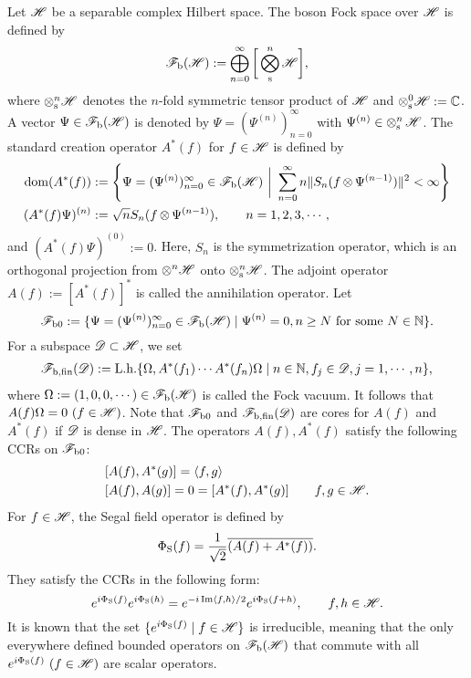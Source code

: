 \documentclass[12pt]{article}
\theoremstyle{plain}
\numberwithin{equation}{section}
\theoremstyle{remark}
\begin{document}
Let $\mathscr{H}$ be a separable complex Hilbert space. The boson Fock space over $\mathscr{H}$ is defined by
\begin{align*}
  \mathscr{F}_\mathrm{b}(\mathscr{H}) := \bigoplus_{n=0}^\infty \bigg[ \mathop{\bigotimes}_\mathrm{s}^n \mathscr{H} \bigg],
\end{align*}
where $\otimes_{\rm s}^n \mathscr{H}$ denotes the $n$-fold symmetric tensor product of $\mathscr{H}$ and $\otimes_{\rm s}^0 \mathscr{H}:=\mathbb{C}$.
A vector $\Psi \in \mathscr{F}_\mathrm{b}(\mathscr{H})$ is denoted by $\Psi = (\Psi^{(n)})_{n=0}^\infty$ with 
$\Psi^{(n)}\in \mathop{\otimes}_\mathrm{s}^n \mathscr{H}$.
The standard creation operator $A^*(f)$ for $f\in\mathscr{H}$ is defined by
\begin{align*}
\mathop{\mathrm{dom}}(A^*(f)) & := \left\{\Psi=(\Psi^{(n)})_{n=0}^\infty \in \mathscr{F}_\mathrm{b}(\mathscr{H}) ~\bigg|~ \sum_{n=0}^\infty n\| S_n(f\mathop{\otimes}\Psi^{(n-1)}) \|^2<\infty\right\} \\
(A^*(f)\Psi)^{(n)} & := \sqrt{n}S_n(f\mathop{\otimes} \Psi^{(n-1)}), \qquad n=1,2,3,\cdots,
\end{align*}
and $(A^*(f)\Psi)^{(0)}:=0$.
Here, $S_n$ is the symmetrization operator, which is an orthogonal projection from $\otimes^n \mathscr{H}$ onto $\otimes_{\rm s}^n \mathscr{H}$.
The adjoint operator $A(f) := [A^*(f)]^*$ is called the annihilation operator.
Let
\[
\mathscr{F}_{\mathrm{b}0} := \{ \Psi=(\Psi^{(n)})_{n=0}^\infty \in \mathscr{F}_\mathrm{b}(\mathscr{H}) \mid \Psi^{(n)} = 0, n\geq N \text{ for some } N\in\mathbb{N} \}.
\]
For a subspace $\mathscr{D} \subset \mathscr{H}$, we set 
\begin{align*}
 \mathscr{F}_\mathrm{b,fin}(\mathscr{D}) := \mathrm{L.h.}\{\Omega, A^*(f_1)\cdots A^*(f_n)\Omega \mid n\in\mathbb{N}, f_j\in\mathscr{D}, j=1,\cdots,n \},
\end{align*}
where $\Omega:=(1,0,0,\cdots)\in\mathscr{F}_\mathrm{b}(\mathscr{H})$ is called the Fock vacuum.
It follows that $A(f)\Omega = 0 ~ (f\in\mathscr{H})$.
Note that $\mathscr{F}_{\mathrm{b}0}$ and $\mathscr{F}_\mathrm{b,fin}(\mathscr{D})$ are cores for $A(f)$ and $A^*(f)$ if $\mathscr{D}$ is dense in $\mathscr{H}$.
The operators $A(f), A^*(f)$ satisfy the following CCRs on $\mathscr{F}_{\mathrm{b}0}$:
\begin{align*}
  & [A(f),A^*(g)] = \left\langle f,g\right\rangle \\
  & [A(f),A(g)] = 0 = [A^*(f), A^*(g)]  ~~~~~~   f,g\in\mathscr{H}.
\end{align*}
For $f\in\mathscr{H}$, the Segal field operator is defined by
\begin{align*}
  \Phi_\mathrm{S}(f) = \frac{1}{\sqrt{2}} \overline{(A(f)+A^*(f))}.
\end{align*}
They satisfy the CCRs in the following form:
\[
 e^{i\Phi_\mathrm{S}(f)}e^{i\Phi_\mathrm{S}(h)} = e^{-i \, \mathrm{Im}\langle f,h\rangle /2}e^{i\Phi_\mathrm{S}(f+h)},
 \qquad f,h\in\mathscr{H}.
\]
It is known that the set $\{e^{i\Phi_\mathrm{S}(f)} \mid f\in\mathscr{H}\}$ is irreducible, 
meaning that the only everywhere defined bounded operators on $\mathscr{F}_\mathrm{b}(\mathscr{H})$ 
that commute with all $e^{i\Phi_\mathrm{S}(f)} ~ (f\in\mathscr{H})$ are scalar operators. 
\end{document}
